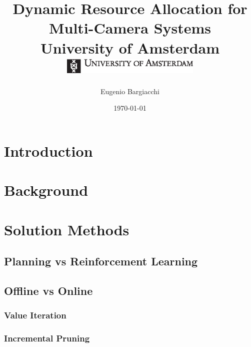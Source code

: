 \documentclass[10pt,twoside]{report}
\title{
    {Dynamic Resource Allocation for Multi-Camera Systems}\\
    {University of Amsterdam}\\\vspace{1cm}
    {\includegraphics[width=0.5\textwidth]{UvA-logo}}
}
\author{Eugenio Bargiacchi}
\date{\today}
\begin{document}
\maketitle


\tableofcontents

\chapter{Introduction}\label{ref:intro}


\chapter{Background}\label{ref:background}


\chapter{Solution Methods}\label{ref:solutions}

    \section{Planning vs Reinforcement Learning}

    \section{Offline vs Online}
        \subsection{Value Iteration}
        \subsection{Incremental Pruning}
\end{document}
